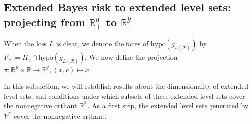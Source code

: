\documentclass[twoside,11pt]{article}
\newcommand{\Comments}{1}
\newcommand{\mynote}[2]{\ifnum\Comments=1\textcolor{#1}{#2}\fi}
\newcommand{\mytodo}[2]{\ifnum\Comments=1%
  \todo[linecolor=#1!80!black,backgroundcolor=#1,bordercolor=#1!80!black]{#2}\fi}
\newcommand{\jessie}[1]{\mynote{teal}{[JF: #1]}}
\newcommand{\jessiet}[1]{\mytodo{teal!20!white}{JF: #1}}
\newcommand{\reals}{\mathbb{R}}
\newcommand{\R}{\mathcal{R}}
\newcommand{\V}{\mathcal{V}}
\newcommand{\Y}{\mathcal{Y}}
\newcommand{\inprod}[2]{\langle #1, #2 \rangle}%
\newcommand{\hyp}{\mathrm{hypo}}
\DeclareMathOperator*{\argmin}{arg\,min}
\newtheorem{claim}{Claim}
\begin{document}



\subsection{Extended Bayes risk to extended level sets: projecting from $\reals^d_+$ to $\reals^\Y_+$}\label{subsec:project-pi}

When the loss $L$ is clear, we denote the faces of $\hyp(g_{L(\R)})$ by $F_v := H_v \cap \hyp(g_{L(\R)})$.
We now define the projection $\pi:\reals^\Y\times \reals \to \reals^\Y, (x,c) \mapsto x$.


In this subsection, we will establish results about the dimensionality of extended level sets, and conditions under which subsets of these extended level sets cover the nonnegative orthant $\reals^\Y_+$.
As a first step, the extended level sets generated by $\V^*$ cover the nonnegative orthant.
\end{document}
